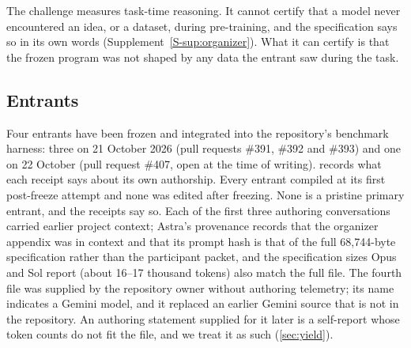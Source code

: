The challenge measures task-time reasoning. It cannot certify that a model never encountered
an idea, or a dataset, during pre-training, and the specification says so in its own words
(Supplement~\ref{S-sup:organizer}). What it can certify is that the frozen program was not shaped by any
data the entrant saw during the task.

\subsection{Entrants}
\label{sec:entrants}

Four entrants have been frozen and integrated into the repository's benchmark harness: three on
21 October 2026 (pull requests \#391, \#392 and \#393) and one on 22 October (pull request \#407,
open at the time of writing).  records what each receipt says about its own
authorship. Every entrant compiled at its first post-freeze attempt and none was edited after
freezing. None is a pristine primary entrant, and the receipts say so. Each of the first three
authoring conversations carried earlier project context; Astra's provenance records that the
organizer appendix was in context and that its prompt hash is that of the full 68,744-byte
specification rather than the participant packet, and the specification sizes Opus and Sol report
(about 16--17 thousand tokens) also match the full file. The fourth file was supplied by the
repository owner without authoring telemetry; its name indicates a Gemini model, and it replaced an
earlier Gemini source that is not in the repository. An authoring statement supplied for it later is
a self-report whose token counts do not fit the file, and we treat it as such (\cref{sec:yield}).

